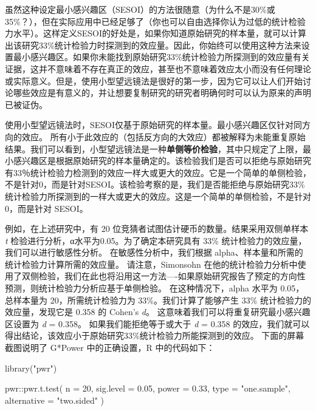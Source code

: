 \documentclass[
  letterpaper,
  DIV=11,
  numbers=noendperiod]{scrreprt}
\newenvironment{Shaded}{\begin{snugshade}}{\end{snugshade}}
\newcommand{\AttributeTok}[1]{\textcolor[rgb]{0.40,0.45,0.13}{#1}}
\newcommand{\DecValTok}[1]{\textcolor[rgb]{0.68,0.00,0.00}{#1}}
\newcommand{\FloatTok}[1]{\textcolor[rgb]{0.68,0.00,0.00}{#1}}
\newcommand{\FunctionTok}[1]{\textcolor[rgb]{0.28,0.35,0.67}{#1}}
\newcommand{\NormalTok}[1]{\textcolor[rgb]{0.00,0.23,0.31}{#1}}
\newcommand{\SpecialCharTok}[1]{\textcolor[rgb]{0.37,0.37,0.37}{#1}}
\newcommand{\StringTok}[1]{\textcolor[rgb]{0.13,0.47,0.30}{#1}}
\begin{document}
虽然这种设定最小感兴趣区（SESOI）的方法很随意（为什么不是30\%或35\%？），但在实际应用中已经足够了（你也可以自由选择你认为过低的统计检验力水平）。这样定义SESOI的好处是，如果你知道原始研究的样本量，就可以计算出该研究33\%统计检验力时探测到的效应量。因此，你始终可以使用这种方法来设置最小感兴趣区。如果你未能找到原始研究33\%统计检验力所探测到的效应量有关证据，这并不意味着不存在真正的效应，甚至也不意味着效应太小而没有任何理论或实际意义。但是，使用小型望远镜法是很好的第一步，因为它可以让人们开始讨论哪些效应是有意义的，并让想要复制研究的研究者明确何时可以认为原来的声明已被证伪。

使用小型望远镜法时，SESOI仅基于原始研究的样本量。最小感兴趣区仅针对同方向的效应。
所有小于此效应的（包括反方向的大效应）都被解释为未能重复原始结果。我们可以看到，小型望远镜法是一种\textbf{单侧等价检验}，其中只规定了上限，最小感兴趣区是根据原始研究的样本量确定的。该检验我们是否可以拒绝与原始研究有33％统计检验力检测到的效应一样大或更大的效应。它是一个简单的单侧检验，不是针对0，而是针对SESOI。该检验考察的是，我们是否能拒绝与原始研究33\%统计检验力所探测到的一样大或更大的效应。这是一个简单的单侧检验，不是针对
0，而是针对 SESOI。

例如，在上述研究中，有 20 位竞猜者试图估计硬币的数量。结果采用双侧单样本
\emph{t} 检验进行分析，α水平为0.05。为了确定本研究具有 33\%
统计检验力的效应量，我们可以进行敏感性分析。 在敏感性分析中，我们根据
alpha、样本量和所需的统计检验力计算所需的效应量。 请注意，Simonsohn
在他的统计检验力分析中使用了双侧检验，我们在此也将沿用这一方法----如果原始研究报告了预定的方向性预测，则统计检验力分析应基于单侧检验。
在这种情况下，alpha 水平为 0.05，总样本量为 20，所需统计检验力为
33\%。我们计算了能够产生 33\% 统计检验力的效应量，发现它是 0.358 的
Cohen's \emph{d}。 这意味着我们可以将重复研究最小感兴趣区设置为 \emph{d}
= 0.358。 如果我们能拒绝等于或大于 \emph{d} = 0.358
的效应，我们就可以得出结论，该效应小于原始研究33\%统计检验力所能探测到的效应。
下面的屏幕截图说明了 G*Power 中的正确设置，R 中的代码如下：

\begin{Shaded}
\begin{Highlighting}[]
\FunctionTok{library}\NormalTok{(}\StringTok{"pwr"}\NormalTok{)}

\NormalTok{pwr}\SpecialCharTok{::}\FunctionTok{pwr.t.test}\NormalTok{(}
  \AttributeTok{n =} \DecValTok{20}\NormalTok{, }
  \AttributeTok{sig.level =} \FloatTok{0.05}\NormalTok{, }
  \AttributeTok{power =} \FloatTok{0.33}\NormalTok{, }
  \AttributeTok{type =} \StringTok{"one.sample"}\NormalTok{,}
  \AttributeTok{alternative =} \StringTok{"two.sided"}
\NormalTok{)}
\end{Highlighting}
\end{Shaded}
\end{document}
